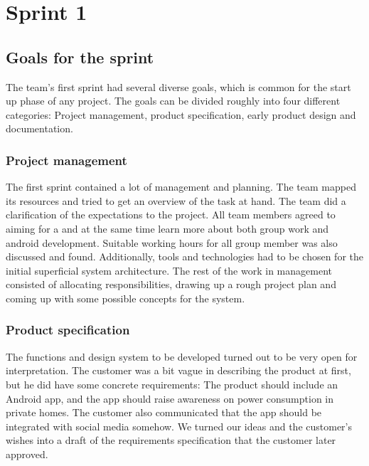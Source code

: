 \section{Sprint 1}

\subsection{Goals for the sprint}
The team's first sprint had several diverse goals, which is common for the start up phase of any project. The goals can be divided roughly into four different categories: Project management, product specification, early product design and documentation.

\subsubsection{Project management}

The first sprint contained a lot of management and planning. The team mapped its resources and tried to get an overview of the task at hand. The team did a clarification of the expectations to the project. All team members agreed to aiming for a  and at the same time learn more about both group work and android development. Suitable working hours for all group member was also discussed and found. Additionally, tools and technologies had to be chosen for the initial superficial system architecture. The rest of the work in management consisted of allocating responsibilities, drawing up a rough project plan and coming up with some possible concepts for the system.

\subsubsection{Product specification}
The functions and design system to be developed turned out to be very open for interpretation. The customer was a bit vague in describing the product at first, but he did have some concrete requirements: The product should include an Android app, and the app should raise awareness on power consumption in private homes. The customer also communicated that the app should be integrated with social media somehow. We turned our ideas and the customer's wishes into a draft of the requirements specification that the customer later approved.

